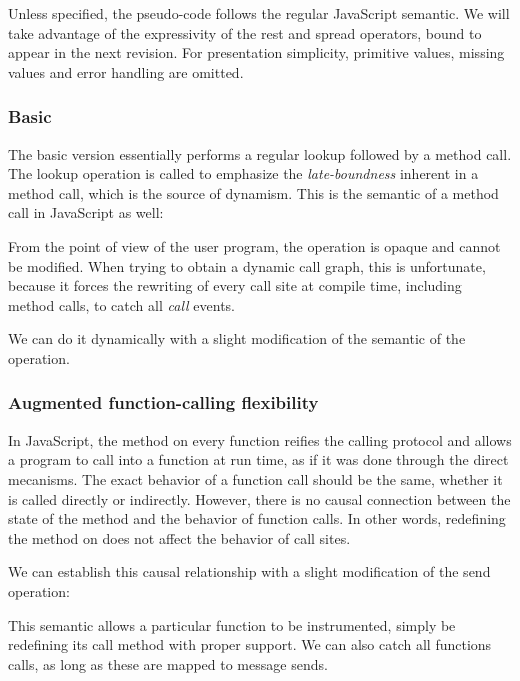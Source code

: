 Unless specified, the pseudo-code follows the regular JavaScript semantic. We
will take advantage of the expressivity of the rest and spread operators, bound
to appear in the next revision. For presentation simplicity, primitive values,
missing values and error handling are omitted.

\subsubsection{Basic}

The basic version essentially performs a regular lookup followed by a method
call. The lookup operation is called  to emphasize the
\textit{late-boundness} inherent in a method call, which is the source of
dynamism. This is the semantic of a method call in JavaScript as well:


From the point of view of the user program, the  operation is opaque
and cannot be modified. When trying to obtain a dynamic call graph, this is
unfortunate, because it forces the rewriting of every call site at compile
time, including method calls, to catch all \textit{call} events.

We can do it dynamically with a slight modification of the semantic of the
operation.

\subsubsection{Augmented function-calling flexibility}
\label{sec:AugmentedFunctionCalling}

In JavaScript, the  method on every function reifies the calling
protocol and allows a program to call into a function at run time, as if it was
done through the direct mecanisms. The exact behavior of a function call should be
the same, whether it is called directly or indirectly. However, there is no
causal connection between the state of the  method and the behavior
of function calls. In other words, redefining the  method on
 does not affect the behavior of call sites.

We can establish this causal relationship with a slight modification of the
send operation:


This semantic allows a particular function to be instrumented, simply be
redefining its call method with proper support. We can also catch all functions
calls, as long as these are mapped to message sends.

